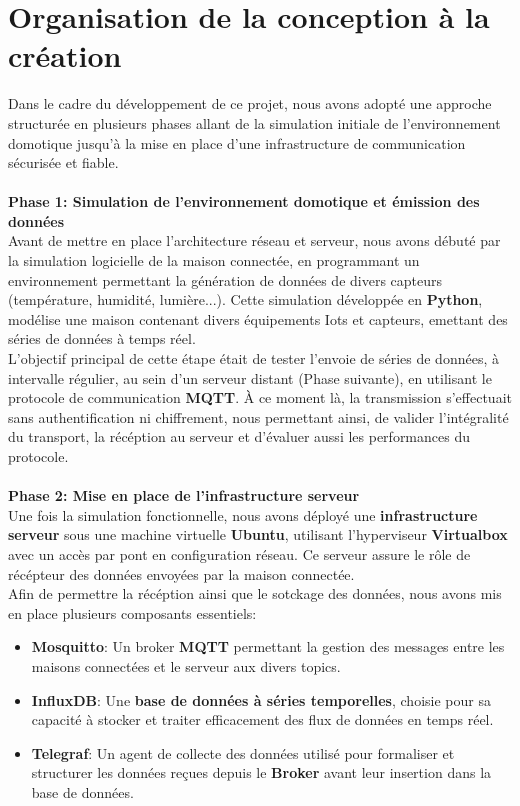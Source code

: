\documentclass[10pt, a4paper]{report}
\begin{document}
	\section{Organisation de la conception à la création}
	Dans le cadre du développement de ce projet, nous avons adopté une approche structurée en plusieurs phases allant de la simulation initiale de l'environnement domotique jusqu'à la mise en place d'une infrastructure de communication sécurisée et fiable.\\\\
	\textbf{Phase 1: Simulation de l'environnement domotique et émission des données}\\
	Avant de mettre en place l'architecture réseau et serveur, nous avons débuté par la simulation logicielle de la maison connectée, en programmant un environnement permettant la génération de données de divers capteurs (température, humidité, lumière...). Cette simulation développée en \textbf{Python}, modélise une maison contenant divers équipements Iots et capteurs, emettant des séries de données à temps réel.\\
	L'objectif principal de cette étape était de tester l'envoie de séries de données, à intervalle régulier, au sein d'un serveur distant (Phase suivante), en utilisant le protocole de communication \textbf{MQTT}. À ce moment là, la transmission s'effectuait sans authentification ni chiffrement, nous permettant ainsi, de valider l'intégralité du transport, la récéption au serveur et d'évaluer aussi les performances du protocole. \\\\
	\textbf{Phase 2: Mise en place de l'infrastructure serveur}\\
	Une fois la simulation fonctionnelle, nous avons déployé une \textbf{infrastructure serveur} sous une machine virtuelle \textbf{Ubuntu}, utilisant l'hyperviseur \textbf{Virtualbox} avec un accès par pont en configuration réseau. Ce serveur assure le rôle de récépteur des données envoyées par la maison connectée.\\
	Afin de permettre la récéption ainsi que le sotckage des données, nous avons mis en place plusieurs composants essentiels:\\
	\begin{itemize}
		\item \textbf{Mosquitto}: Un broker \textbf{MQTT} permettant la gestion des messages entre les maisons connectées et le serveur aux divers topics.
		\item \textbf{InfluxDB}: Une \textbf{base de données à séries temporelles}, choisie pour sa capacité à stocker et traiter efficacement des flux de données en temps réel.
		\item \textbf{Telegraf}: Un agent de collecte des données utilisé pour formaliser et structurer les données reçues depuis le \textbf{Broker} avant leur insertion dans la base de données.\\
	\end{itemize}
\end{document}
